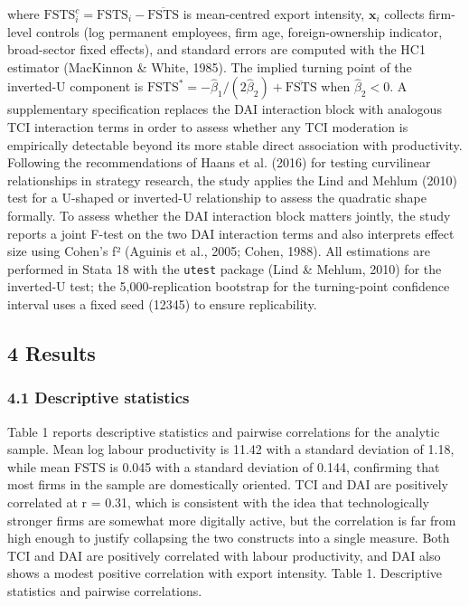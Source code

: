 \documentclass[12pt,a4paper]{article}
\begin{document}
where
\(\mathrm{FSTS}^{c}_i = \mathrm{FSTS}_i - \overline{\mathrm{FSTS}}\) is
mean-centred export intensity, \(\mathbf{x}_i\) collects firm-level
controls (log permanent employees, firm age, foreign-ownership
indicator, broad-sector fixed effects), and standard errors are computed
with the HC1 estimator (MacKinnon \& White, 1985). The implied turning
point of the inverted-U component is
\(\mathrm{FSTS}^{*} = -\hat{\beta}_1/(2\hat{\beta}_2) + \overline{\mathrm{FSTS}}\)
when \(\hat{\beta}_2 < 0\). A supplementary specification replaces the
DAI interaction block with analogous TCI interaction terms in order to
assess whether any TCI moderation is empirically detectable beyond its
more stable direct association with productivity. Following the
recommendations of Haans et al. (2016) for testing curvilinear
relationships in strategy research, the study applies the Lind and
Mehlum (2010) test for a U-shaped or inverted-U relationship to assess
the quadratic shape formally. To assess whether the DAI interaction
block matters jointly, the study reports a joint F-test on the two DAI
interaction terms and also interprets effect size using Cohen's f²
(Aguinis et al., 2005; Cohen, 1988). All estimations are performed in
Stata 18 with the \texttt{utest} package (Lind \& Mehlum, 2010) for the
inverted-U test; the 5,000-replication bootstrap for the turning-point
confidence interval uses a fixed seed (12345) to ensure replicability.

\hypertarget{4-results}{%
\subsection{4 Results}\label{4-results}}

\hypertarget{41-descriptive-statistics}{%
\subsubsection{4.1 Descriptive
statistics}\label{41-descriptive-statistics}}

Table 1 reports descriptive statistics and pairwise correlations for the
analytic sample. Mean log labour productivity is 11.42 with a standard
deviation of 1.18, while mean FSTS is 0.045 with a standard deviation of
0.144, confirming that most firms in the sample are domestically
oriented. TCI and DAI are positively correlated at r = 0.31, which is
consistent with the idea that technologically stronger firms are
somewhat more digitally active, but the correlation is far from high
enough to justify collapsing the two constructs into a single measure.
Both TCI and DAI are positively correlated with labour productivity, and
DAI also shows a modest positive correlation with export intensity.
Table 1. Descriptive statistics and pairwise correlations.
\end{document}
